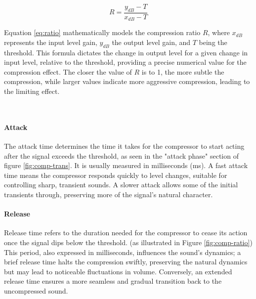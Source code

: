 \documentclass[10pt]{article}
\begin{document}
\begin{multicols*}{2}
                \begin{equation} \label{eq:ratio}
                    R=\frac{y_{dB}-T}{x_{dB}-T}
                \end{equation}

                \noindent Equation \ref{eq:ratio} mathematically models the compression ratio $R$, where $x_{dB}$ represents the input level gain, $y_{dB}$ the output level gain, and $T$ being the threshold. This formula dictates the change in output level for a given change in input level, relative to the threshold, providing a precise numerical value for the compression effect. The closer the value of $R$ is to 1, the more subtle the compression, while larger values indicate more aggressive compression, leading to the limiting effect.

                \noindent
                \begin{minipage}{\linewidth}
                    \centering
                    
                    \label{fig:comp-trans}
                \end{minipage}\\

            \paragraph{Attack}
                The attack time determines the time it takes for the compressor to start acting after the signal exceeds the threshold, as seen in the "attack phase" section of figure \ref{fig:comp-trans}. It is usually measured in milliseconds (ms). A fast attack time means the compressor responds quickly to level changes, suitable for controlling sharp, transient sounds. A slower attack allows some of the initial transients through, preserving more of the signal's natural character.

            \paragraph{Release}
                Release time refers to the duration needed for the compressor to cease its action once the signal dips below the threshold. (as illustrated in Figure \ref{fig:comp-ratio}) This period, also expressed in milliseconds, influences the sound's dynamics; a brief release time halts the compression swiftly, preserving the natural dynamics but may lead to noticeable fluctuations in volume. Conversely, an extended release time ensures a more seamless and gradual transition back to the uncompressed sound.


\end{multicols*}
\end{document}
